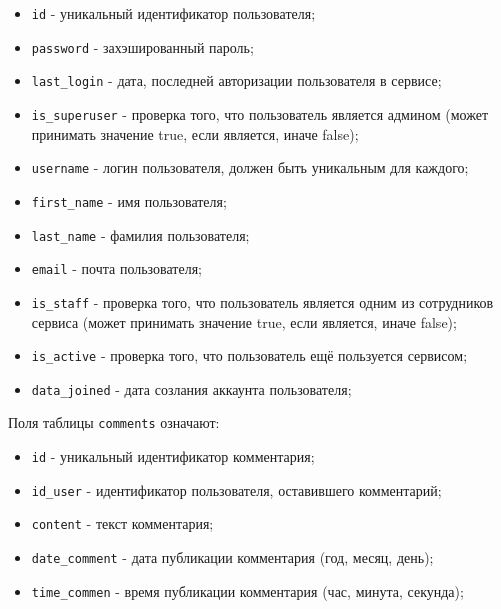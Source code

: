 \begin{itemize}
	
	\item  \texttt{id} - уникальный идентификатор пользователя;
	
	\item  \texttt{password} - захэшированный пароль;
	
	\item  \texttt{last\_login} - дата, последней авторизации пользователя в сервисе;
	
	\item  \texttt{is\_superuser} - проверка того, что пользователь является админом (может принимать значение true, если является, иначе false);
	
	\item  \texttt{username} - логин пользователя, должен быть уникальным для каждого;
	
	\item  \texttt{first\_name} - имя пользователя;
	
	\item  \texttt{last\_name} - фамилия пользователя;
	
	\item  \texttt{email} - почта пользователя;
		
	\item  \texttt{is\_staff} - проверка того, что пользователь является одним из сотрудников сервиса (может принимать значение true, если является, иначе false);
	
	\item  \texttt{is\_active} - проверка того, что пользователь ещё пользуется сервисом;
	
	\item  \texttt{data\_joined} - дата созлания аккаунта пользователя;
	
\end{itemize}




Поля таблицы \texttt{comments} означают:

\begin{itemize}

\item  \texttt{id} - уникальный идентификатор комментария;

\item  \texttt{id\_user} - идентификатор пользователя, оставившего комментарий;

\item  \texttt{content} - текст комментария;

\item  \texttt{date\_comment} - дата публикации комментария (год, месяц, день);

\item  \texttt{time\_commen} - время публикации комментария (час, минута, секунда);

\end{itemize}


